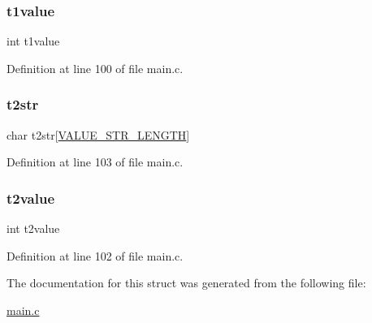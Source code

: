 \mbox{\label{struct__data_ae42a6c28c48b336eb8346a7a749a1764}} 
\subsubsection{\texorpdfstring{t1value}{t1value}}
{\footnotesize\ttfamily int t1value}



Definition at line 100 of file main.\+c.

\mbox{\label{struct__data_a516d3e35b1f6f0597c1f4ce7da4bd7f5}} 
\subsubsection{\texorpdfstring{t2str}{t2str}}
{\footnotesize\ttfamily char t2str\mbox{[}\hyperlink{main_8c_a0ce73b7419565289cf9636d1d986c348}{V\+A\+L\+U\+E\+\_\+\+S\+T\+R\+\_\+\+L\+E\+N\+G\+TH}\mbox{]}}



Definition at line 103 of file main.\+c.

\mbox{\label{struct__data_a31041380c5820f78ea7aacb0f221bcc8}} 
\subsubsection{\texorpdfstring{t2value}{t2value}}
{\footnotesize\ttfamily int t2value}



Definition at line 102 of file main.\+c.



The documentation for this struct was generated from the following file\+:\begin{DoxyCompactItemize}
\item 
\hyperlink{main_8c}{main.\+c}\end{DoxyCompactItemize}
